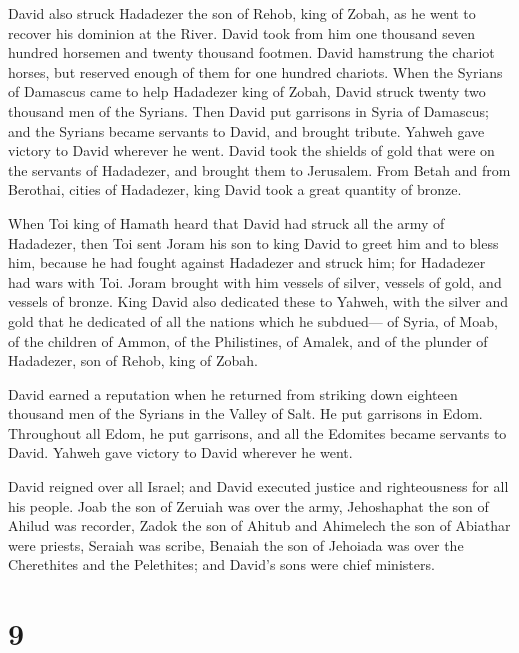  David also struck Hadadezer the son of Rehob, king of
Zobah, as he went to recover his dominion at the River. 
David took from him one thousand seven hundred horsemen and twenty
thousand footmen. David hamstrung the chariot horses, but reserved
enough of them for one hundred chariots.  When the Syrians
of Damascus came to help Hadadezer king of Zobah, David struck twenty
two thousand men of the Syrians.  Then David put garrisons
in Syria of Damascus; and the Syrians became servants to David, and
brought tribute. Yahweh gave victory to David wherever he went.
 David took the shields of gold that were on the servants of
Hadadezer, and brought them to Jerusalem.  From Betah and
from Berothai, cities of Hadadezer, king David took a great quantity of
bronze.

 When Toi king of Hamath heard that David had struck all the
army of Hadadezer,  then Toi sent Joram his son to king
David to greet him and to bless him, because he had fought against
Hadadezer and struck him; for Hadadezer had wars with Toi. Joram brought
with him vessels of silver, vessels of gold, and vessels of bronze.
 King David also dedicated these to Yahweh, with the silver
and gold that he dedicated of all the nations which he subdued---
 of Syria, of Moab, of the children of Ammon, of the
Philistines, of Amalek, and of the plunder of Hadadezer, son of Rehob,
king of Zobah.

 David earned a reputation when he returned from striking
down eighteen thousand men of the Syrians in the Valley of Salt.
 He put garrisons in Edom. Throughout all Edom, he put
garrisons, and all the Edomites became servants to David. Yahweh gave
victory to David wherever he went.

 David reigned over all Israel; and David executed justice
and righteousness for all his people.  Joab the son of
Zeruiah was over the army, Jehoshaphat the son of Ahilud was recorder,
 Zadok the son of Ahitub and Ahimelech the son of Abiathar
were priests, Seraiah was scribe,  Benaiah the son of
Jehoiada was over the Cherethites and the Pelethites; and David's sons
were chief ministers.

\hypertarget{section-8}{%
\section{9}\label{section-8}}

